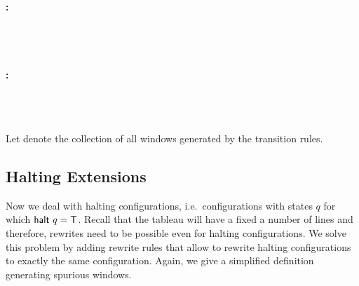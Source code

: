 \paragraph{:}
\begin{center}
  \quad {}\\
  \quad {} \\
  \quad {}
\end{center} 

\paragraph{:}
\begin{center}
  \quad {}\\
  \quad {}
  \quad {}\\
  \quad {}
\end{center}

Let \mnotec{$\Rtrans$} denote the collection of all windows generated by the transition rules. 

\subsection{Halting Extensions}
Now we deal with halting configurations, i.e.\ configurations with states $q$ for which $\textsf{halt}~q = \mathsf{T}$. Recall that the tableau will have a fixed a number of lines and therefore, rewrites need to be possible even for halting configurations. We solve this problem by adding rewrite rules that allow to rewrite halting configurations to exactly the same configuration. Again, we give a simplified definition generating spurious windows.

